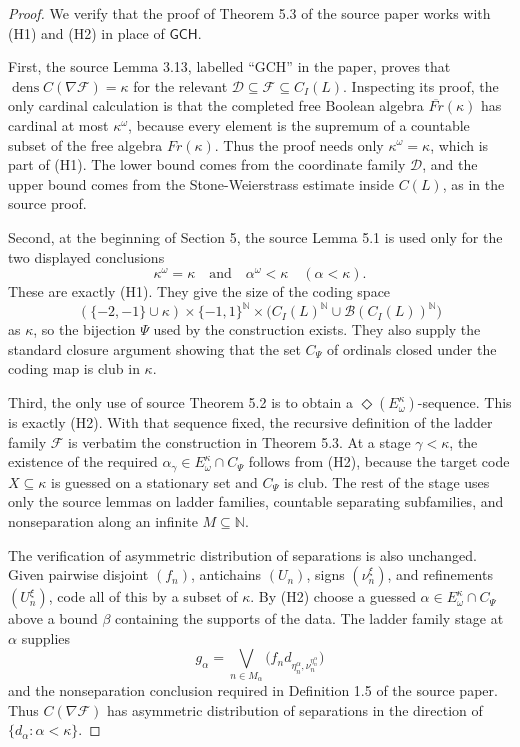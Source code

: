 \documentclass[11pt]{article}
\newcommand{\dens}{\operatorname{dens}}
\newcommand{\N}{\mathbb{N}}
\newcommand{\D}{\mathcal{D}}
\newcommand{\F}{\mathcal{F}}
\newcommand{\B}{\mathcal{B}}
\newcommand{\CI}{C_I}
\newcommand{\GCH}{\mathsf{GCH}}
\newcommand{\DiamondE}{\Diamond(E^\kappa_\omega)}
\begin{document}
\begin{proof}
We verify that the proof of Theorem 5.3 of the source paper works with (H1)
and (H2) in place of \(\GCH\).

First, the source Lemma 3.13, labelled ``GCH'' in the paper, proves that
\(\dens C(\nabla\F)=\kappa\) for the relevant
\(\D\subseteq\F\subseteq \CI(L)\).  Inspecting its proof, the only cardinal
calculation is that the completed free Boolean algebra \(\overline{Fr}(\kappa)\)
has cardinal at most \(\kappa^\omega\), because every element is the supremum
of a countable subset of the free algebra \(Fr(\kappa)\).  Thus the proof
needs only \(\kappa^\omega=\kappa\), which is part of (H1).  The lower bound
comes from the coordinate family \(\D\), and the upper bound comes from the
Stone-Weierstrass estimate inside \(C(L)\), as in the source proof.

Second, at the beginning of Section 5, the source Lemma 5.1 is used only for
the two displayed conclusions
\[
\kappa^\omega=\kappa
\quad\text{and}\quad
\alpha^\omega<\kappa\quad(\alpha<\kappa).
\]
These are exactly (H1).  They give the size of the coding space
\[
(\{-2,-1\}\cup\kappa)\times\{-1,1\}^{\N}\times
\bigl(\CI(L)^{\N}\cup\B(\CI(L))^{\N}\bigr)
\]
as \(\kappa\), so the bijection \(\Psi\) used by the construction exists.
They also supply the standard closure argument showing that the set \(C_\Psi\)
of ordinals closed under the coding map is club in \(\kappa\).

Third, the only use of source Theorem 5.2 is to obtain a
\(\DiamondE\)-sequence.  This is exactly (H2).  With that sequence fixed, the
recursive definition of the ladder family \(\F\) is verbatim the construction
in Theorem 5.3.  At a stage \(\gamma<\kappa\), the existence of the required
\(\alpha_\gamma\in E^\kappa_\omega\cap C_\Psi\) follows from (H2), because
the target code \(X\subseteq\kappa\) is guessed on a stationary set and
\(C_\Psi\) is club.  The rest of the stage uses only the source lemmas on
ladder families, countable separating subfamilies, and nonseparation along an
infinite \(M\subseteq\N\).

The verification of asymmetric distribution of separations is also unchanged.
Given pairwise disjoint \((f_n)\), antichains \((U_n)\), signs
\((\nu^\xi_n)\), and refinements \((U^\xi_n)\), code all of this by a subset
of \(\kappa\).  By (H2) choose a guessed \(\alpha\in E^\kappa_\omega\cap
C_\Psi\) above a bound \(\beta\) containing the supports of the data.  The
ladder family stage at \(\alpha\) supplies
\[
g_\alpha=\bigvee_{n\in M_\alpha}
\bigl(f_n d_{\eta^\alpha_n,\nu^{\eta^\alpha_n}_n}\bigr)
\]
and the nonseparation conclusion required in Definition 1.5 of the source
paper.  Thus \(C(\nabla\F)\) has asymmetric distribution of separations in the
direction of \(\{d_\alpha:\alpha<\kappa\}\).


\end{proof}
\end{document}
